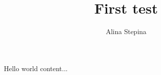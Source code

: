 \documentclass[a4paper,12pt]{article}
\author{Alina Stepina}
\title{First test}
\begin{document}
	\maketitle
	
	Hello world
	content...
\end{document}
